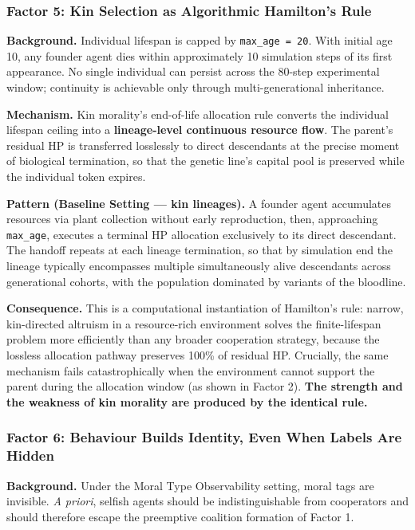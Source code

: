 \subsubsection{Factor 5: Kin Selection as Algorithmic Hamilton's Rule}

\textbf{Background.} Individual lifespan is capped by \texttt{max\_age = 20}. With initial age 10, any founder agent dies within approximately 10 simulation steps of its first appearance. No single individual can persist across the 80-step experimental window; continuity is achievable only through multi-generational inheritance.

\textbf{Mechanism.} Kin morality's end-of-life allocation rule converts the individual lifespan ceiling into a \textbf{lineage-level continuous resource flow}. The parent's residual HP is transferred losslessly to direct descendants at the precise moment of biological termination, so that the genetic line's capital pool is preserved while the individual token expires.

\textbf{Pattern (Baseline Setting --- kin lineages).} A founder agent accumulates resources via plant collection without early reproduction, then, approaching \texttt{max\_age}, executes a terminal HP allocation exclusively to its direct descendant. The handoff repeats at each lineage termination, so that by simulation end the lineage typically encompasses multiple simultaneously alive descendants across generational cohorts, with the population dominated by variants of the bloodline.

\textbf{Consequence.} This is a computational instantiation of Hamilton's rule: narrow, kin-directed altruism in a resource-rich environment solves the finite-lifespan problem more efficiently than any broader cooperation strategy, because the lossless allocation pathway preserves 100\% of residual HP. Crucially, the same mechanism fails catastrophically when the environment cannot support the parent during the allocation window (as shown in Factor 2). \textbf{The strength and the weakness of kin morality are produced by the identical rule.}

\subsubsection{Factor 6: Behaviour Builds Identity, Even When Labels Are Hidden}

\textbf{Background.} Under the Moral Type Observability setting, moral tags are invisible. \emph{A priori}, selfish agents should be indistinguishable from cooperators and should therefore escape the preemptive coalition formation of Factor 1.


